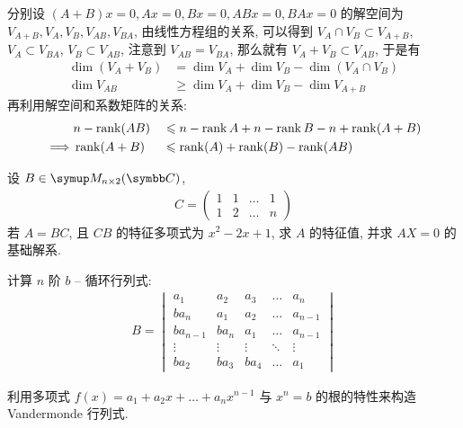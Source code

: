 \begin{exercise}[series=exer]
\begin{hint}
    \end{hint}
    \begin{answer}
        分别设 $ (A + B)x = 0, Ax = 0, Bx = 0, ABx = 0, BAx = 0 $ 的解空间为 $ V_{A+B}, V_{A}, V_{B}, V_{AB}, V_{BA} $, 由线性方程组的关系, 可以得到 $ V_{A} \cap V_{B} \subset V_{A + B} $, $ V_{A} \subset V_{BA}  $, $ V_{B} \subset V_{AB} $, 注意到 $ V_{AB} = V_{BA} $, 那么就有 $ V_{A} + V_{B} \subset V_{AB} $, 于是有
        \begin{align*}
            \dim(V_{A} + V_{B}) & = \dim V_{A} + \dim V_{B} - \dim(V_{A} \cap V_{B})\\
            \dim V_{AB} & \ge  \dim V_{A} + \dim V_{B} - \dim V_{A + B}
        \end{align*}
        再利用解空间和系数矩阵的关系:
        \begin{alignat*}{2}
            & n - \rank (AB) && \leqslant  n - \rank A + n - \rank B - n + \rank (A + B) \\
            \implies & \rank(A + B) && \leqslant \rank(A) + \rank(B) - \rank(AB)
        \end{alignat*}
    \end{answer}
    \item 设 $ B \in \MM[\C][n \times 2] $, 
    \begin{align*}
        C = \begin{pmatrix}
            1 & 1 & \dots & 1\\
            1 & 2 & \dots & n
        \end{pmatrix}
    \end{align*}
    若 $ A = BC $, 且 $ CB $ 的特征多项式为 $ x^{2} - 2x + 1 $, 求 $ A $ 的特征值, 并求 $ AX = 0 $ 的基础解系. 
    \item  计算 $ n $ 阶 $ b $ -- 循环行列式:
    \begin{align*}
        B = \begin{vmatrix}
            a_{1}   & a_{2} & a_{3} & \ldots    & a_{n} \\
            ba_{n}  & a_{1} & a_{2} & \ldots    & a_{n-1} \\
            ba_{n-1}    & ba_{n}    & a_{1} & \ldots & a_{n-1} \\
            \vdots  & \vdots & \vdots & \ddots & \vdots \\
            ba_{2} & ba_{3} & ba_{4} & \ldots & a_{1}
        \end{vmatrix}
    \end{align*}
    \begin{hint}
        利用多项式 $ f(x) = a_{1} + a_{2}x + \dots + a_{n}x^{n-1} $ 与 $ x^{n} = b $ 的根的特性来构造 Vandermonde 行列式. 

\end{hint}
\end{exercise}
